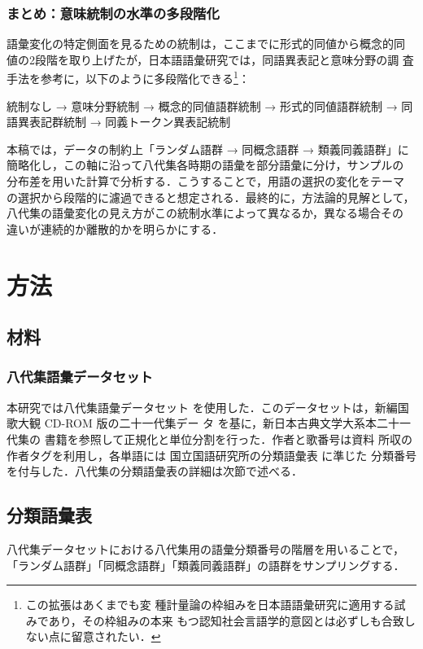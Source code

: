 \documentclass[submit]{ipsj}
\begin{document}
\subsubsection{まとめ：意味統制の水準の多段階化}
\label{sec:org561a36f}
語彙変化の特定側面を見るための統制は，ここまでに形式的同値から概念的同
値の2段階を取り上げたが，日本語語彙研究では，同語異表記と意味分野の調
査手法を参考に，以下のように多段階化できる\footnote{この拡張はあくまでも変
種計量論の枠組みを日本語語彙研究に適用する試みであり，その枠組みの本来
もつ認知社会言語学的意図とは必ずしも合致しない点に留意されたい．}：

統制なし → 意味分野統制 → 概念的同値語群統制 → 形式的同値語群統制 → 同
語異表記群統制 → 同義トークン異表記統制

本稿では，データの制約上「ランダム語群 → 同概念語群 → 類義同義語群」に
簡略化し，この軸に沿って八代集各時期の語彙を部分語彙に分け，サンプルの
分布差を用いた計算で分析する．こうすることで，用語の選択の変化をテーマ
の選択から段階的に濾過できると想定される．最終的に，方法論的見解として，
八代集の語彙変化の見え方がこの統制水準によって異なるか，異なる場合その
違いが連続的か離散的かを明らかにする．
\section{方法\label{org9bba440}}
\label{sec:org5e49564}
\subsection{材料\label{org63f7818}}
\label{sec:org5423a27}
\subsubsection{八代集語彙データセット\label{org7d92606}}
\label{sec:orge7ac0b8}
本研究では八代集語彙データセット \cite{Hodoscek2022Developmenta}
を使用した．このデータセットは，新編国歌大観 CD-ROM 版の二十一代集デー
タ\cite{shinhen1996CDROM} を基に，新日本古典文学大系本二十一代集の
書籍を参照して正規化と単位分割を行った．作者と歌番号は資料
\cite{nakamura1999Kokubungaku} 所収の作者タグを利用し，各単語には
国立国語研究所の分類語彙表 \cite{nakano1994Bunruigoihyo} に準じた
分類番号を付与した．八代集の分類語彙表の詳細は次節で述べる．
\subsection{分類語彙表\label{org73da188}}
\label{sec:org72dd961}
八代集データセットにおける八代集用の語彙分類番号の階層を用いることで，
「ランダム語群」「同概念語群」「類義同義語群」の語群をサンプリングする．
\end{document}
